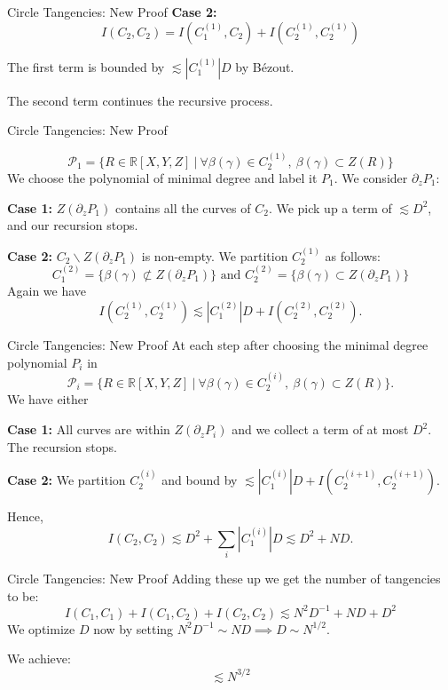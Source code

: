 \documentclass{beamer}
\newcommand{\RR}{\mathbb R}
\newcommand{\nfr}[1]{\begin{frame} #1
\end{frame}}
\begin{document}
\nfr{{Circle Tangencies: New Proof }
\textbf{Case 2:}
\[
    I(C_2, C_2) = I(C_1^{(1)}, C_2) + I(C_2^{(1)}, C_2^{(1)})
\]

The first term is bounded by $\lesssim |C_1^{(1)}|D$ by Bézout.

The second term continues the recursive process.

}
\nfr{{Circle Tangencies: New Proof }

\[
\mathcal{P}_1 = \{R \in \RR[X,Y,Z] \ | \ \forall \beta(\gamma) \in C_2^{(1)},\ \beta(\gamma) \subset Z(R) \}
\]
We choose the polynomial of minimal degree and label it $P_1$.
We consider $\partial_z P_1$:

\textbf{Case 1:} $Z(\partial_z P_1)$ contains all the curves of $C_2$. We pick up a term of $\lesssim D^2$, and our recursion stops. 

\pause
\textbf{Case 2:} $C_2 \backslash Z(\partial_z P_1)$ is non-empty. We partition $C_2^{(1)}$ as follows:
\[
   C_1^{(2)} = \{\beta(\gamma) \not \subset Z(\partial_z P_1) \} \text{ and } C_2^{(2)} = \{\beta(\gamma) \subset Z(\partial_z P_1) \} 
\]
Again we have 
\[
    I(C_2^{(1)}, C_2^{(1)}) \lesssim |C_1^{(2)}|D + I(C_2^{(2)}, C_2^{(2)}).
\]

}

\nfr{{Circle Tangencies: New Proof }
At each step after choosing the minimal degree polynomial $P_i$ in \[
    \mathcal{P}_i = \{R \in \RR[X,Y,Z] \ | \ \forall \beta(\gamma) \in C_2^{(i)},\ \beta(\gamma) \subset Z(R) \}.
    \]
We have either

\textbf{Case 1:} All curves are within $Z(\partial_z P_i)$ and we collect a term of at most $D^2$. The recursion stops.

\textbf{Case 2:} We partition $C_2^{(i)}$ and bound by 
$\lesssim |C_1^{(i)}|D + I(C_2^{(i+1)}, C_2^{(i+1)})$.

\pause

Hence,
\[
I(C_2, C_2) \lesssim D^2 + \sum_i |C_1^{(i)}| D  \lesssim D^2 + ND .
\]


}


\nfr{{Circle Tangencies: New Proof }
Adding these up we get the number of tangencies to be:
\[
    I(C_1,C_1) +I(C_1,C_2) + I(C_2,C_2) \lesssim N^2 D^{-1} + ND + D^2  
\]
\pause
We optimize $D$ now by setting $N^2 D^{-1} \sim ND \implies D \sim N^{1/2}$.

We achieve:
\[
    \lesssim  N^{3/2} 
\]
}
\end{document}
